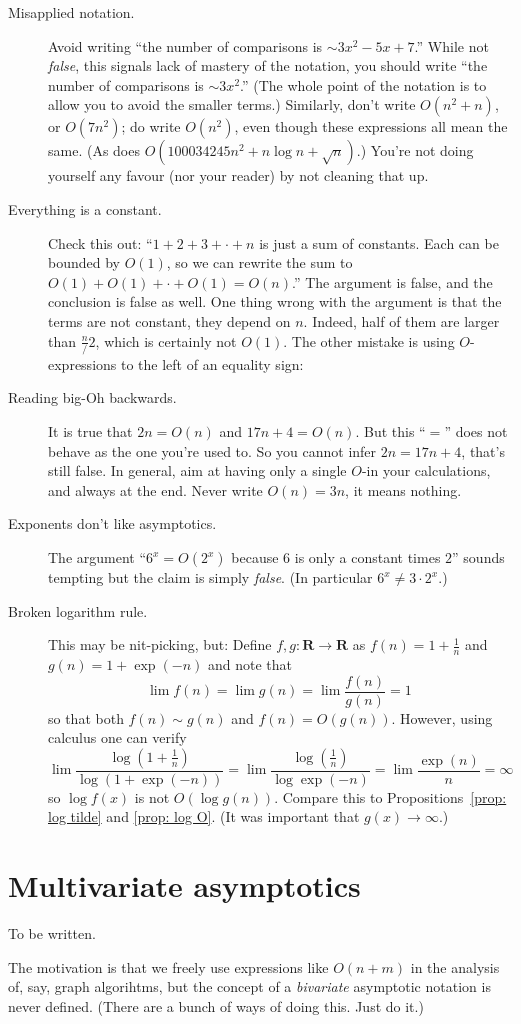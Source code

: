 \documentclass{tstextbook}
\begin{document}
\begin{description}
  \item[Misapplied notation.] 
    Avoid writing ``the number of comparisons is $\sim 3x^2  - 5x +7$.''
    While not \emph{false}, this signals lack of mastery of the notation, you should write
    ``the number of comparisons is $\sim 3x^2$.''
    (The whole point of the notation is to allow you to avoid the smaller terms.)
    Similarly, don't write $O(n^2 + n)$, or $O(7n^2)$; do write $O(n^2)$, even though these expressions all mean the same. 
    (As does $O(100034245n^2 + n\log n +\sqrt n)$.)
    You're not doing yourself any favour (nor your reader) by not cleaning that up.
  \item[Everything is a constant.]
    Check this out: ``$1+2+3+\cdot + n$ is just a sum of constants.
    Each can be bounded by $O(1)$, so we can rewrite the sum to $O(1)+ O(1) +\cdot +O(1)=O(n)$.''
    The argument is false, and the conclusion is false as well.
    One thing wrong with the argument is that the terms are not constant, they depend on $n$.
    Indeed, half of them are larger than $\frac n/2$, which is certainly not $O(1)$.
    The other mistake is using $O$-expressions to the left of an equality sign:
  \item[Reading big-Oh backwards.]
    It is true that $2n =O(n)$ and $17n+4 =O(n)$.
    But this ``$=$'' does not behave as the one you're used to.
    So you cannot infer $2n=17n+4$, that's still false.
    In general, aim at having only a single $O$-in your calculations, and always at the end.
    Never write $O(n)= 3n$, it means nothing.
  \item[Exponents don't like asymptotics.]
    The argument ``$6^x = O(2^x)$ because $6$ is only a constant times $2$'' sounds tempting but the claim is simply \emph{false}.
    (In particular $6^x \neq 3\cdot 2^x$.)
  \item[Broken logarithm rule.]
    This may be nit-picking, but:
    Define $f,g\colon \mathbf R\rightarrow \mathbf R$ as $f(n)=1+\frac1n$ and $g(n)=1+\exp(-n)$ and 
    note that \[ 
    \lim f(n) = \lim g(n)= \lim \frac{f(n)}{g(n)} = 1\,\]
    so that both $f(n)\sim g(n)$ and $f(n)=O(g(n))$.
    However, using calculus one can verify
    \[ 
    \lim \frac{\log (1+\frac1n)}{\log(1+\exp(-n))} =
    \lim \frac{\log (\frac1n)}{\log\exp(-n)} =
    \lim \frac{\exp(n)}{n}=\infty\,
    \]
    so $\log f(x)$ is not $O(\log g(n))$.
    Compare this to Propositions~\ref{prop: log tilde} and \ref{prop: log O}.
    (It was important that $g(x)\rightarrow \infty$.)
\end{description}

\section{Multivariate asymptotics}

To be written.

The motivation is that we freely use expressions like $O(n+m)$ in the analysis of, say, graph algorihtms, but the concept of a \emph{bivariate} asymptotic notation is never defined.
(There are a bunch of ways of doing this.
Just do it.)
\end{document}
